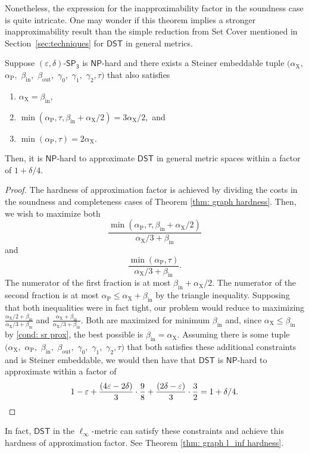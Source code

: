 \documentclass{article}\providecommand{\DeclareRedundantLanguages}[2]{}\usepackage[a4paper,margin=20mm]{geometry}
\newcommand{\1}{\textbf{1}}
\newcommand{\setpT}{$\mathsf{SP_3}$\xspace}
\newcommand{\dst}{$\mathsf{DST}$\xspace}
\newcommand{\np}{$\mathsf{NP}$\xspace}
\newcommand{\td}{\tau}
\newcommand{\srd}{\alpha_{\text{X}}}
\newcommand{\trd}{\alpha_{\text{P}}}
\begin{document}
Nonetheless, the expression for the inapproximability factor in the soundness case is quite intricate. One may wonder if this theorem implies a stronger inapproximability result than the simple reduction from Set Cover mentioned in Section~\ref{sec:techniques} for \dst in general metrics.  
\begin{corollary} \label{cor: general metric useless?}
Suppose $(\varepsilon, \delta)$-\setpT is \np-hard and there exists a Steiner embeddable tuple $(\srd,$ $\trd,$ $\beta_{\text{in}},$ $\beta_{\text{out}},$ $\gamma_0,$ $\gamma_1,$ $\gamma_2,\td)$ that also satisfies 
\begin{enumerate}
    \item $\srd = \beta_{\text{in}}$,
    \item $\min(\trd, \td, \beta_{\text{in}} + \srd/2) = 3\srd/2,$ and
    \item $\min(\trd, \td) =2\srd$.
\end{enumerate}
Then, it is \np-hard to approximate \dst in general metric spaces within a factor of $1 + \delta/4$.
\end{corollary}
\begin{proof}
The hardness of approximation factor is achieved by dividing the costs in the soundness and completeness cases of Theorem \ref{thm: graph hardness}. Then, we wish to maximize both
\[
\frac{\min(\trd, \td, \beta_{\text{in}} + \srd/2)}{\srd/3+\beta_{\text{in}}} 
\]
and 
\[
\frac{\min(\trd, \td)}{\srd/3+\beta_{\text{in}}}.
\]
The numerator of the first fraction is at most $\beta_{\text{in}} + \srd/2$. The numerator of the second fraction is at most $\trd \leq \srd + \beta_{\text{in}}$ by the triangle inequality. Supposing that both inequalities were in fact tight, our problem would reduce to maximizing  $\frac{\srd/2 + \beta_{\text{in}} }{\srd/3+\beta_{\text{in}}}$ and $\frac{\srd + \beta_{\text{in}}}{\srd/3+\beta_{\text{in}}}$. Both are maximized for minimum $\beta_{\text{in}}$ and, since $\srd \leq \beta_{\text{in}}$ by \ref{cond: sr prox}, the best possible is $\beta_{\text{in}} = \srd$. Assuming there is some tuple $(\srd,$ $\trd,$ $\beta_{\text{in}},$ $\beta_{\text{out}},$ $\gamma_0,$ $\gamma_1,$ $\gamma_2,\td)$ that both satisfies these additional constraints and is Steiner embeddable, we would then have that \dst is \np-hard to approximate within a factor of 
\[
1 - \varepsilon + \frac{(4\varepsilon  - 2\delta)}{3}\cdot\frac{9}{8} + \frac{(2\delta  - \varepsilon)}{3} \cdot \frac{3}{2} = 1 + \delta/4.\qedhere
\]
\end{proof}
In fact, \dst in the $\ell_{\infty}$-metric can satisfy these constraints and achieve this hardness of approximation factor. See Theorem \ref{thm: graph l_inf hardness}.
\end{document}
